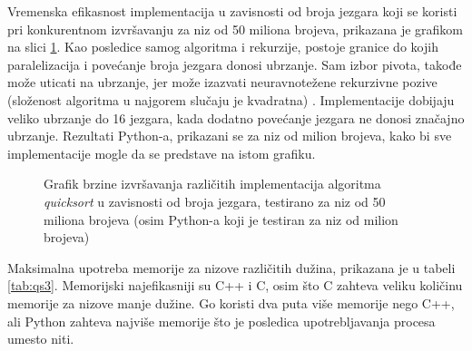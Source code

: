 \documentclass[12pt,oneside]{memoir}
\begin{document}
Vremenska efikasnost implementacija u zavisnosti od broja jezgara koji se koristi pri konkurentnom izvršavanju za niz od 50 miliona brojeva, prikazana je grafikom na slici \ref{fig:qs1}. Kao posledice samog algoritma i rekurzije, postoje granice do kojih paralelizacija i povećanje broja jezgara donosi ubrzanje. Sam izbor pivota, takođe može uticati na ubrzanje, jer može izazvati neuravnotežene rekurzivne pozive (složenost algoritma u najgorem slučaju je kvadratna) \cite{qsp}. Implementacije dobijaju veliko ubrzanje do 16 jezgara, kada dodatno povećanje jezgara ne donosi značajno ubrzanje. Rezultati Python-a, prikazani se za niz od milion brojeva, kako bi sve implementacije mogle da se predstave na istom grafiku.

\begin{figure}
\begin{center}


\caption{Grafik brzine izvršavanja različitih implementacija algoritma \textit{quicksort} u zavisnosti od broja jezgara, testirano za niz od 50 miliona brojeva (osim Python-a koji je testiran za niz od milion brojeva)}
\label{fig:qs1}
\end{center}
\end{figure}

Maksimalna upotreba memorije za nizove različitih dužina, prikazana je u tabeli \ref{tab:qs3}. Memorijski najefikasniji su C++ i C, osim što C zahteva veliku količinu memorije za nizove manje dužine. Go koristi dva puta više memorije nego C++, ali Python zahteva najviše memorije što je posledica upotrebljavanja procesa umesto niti. 
\end{document}
